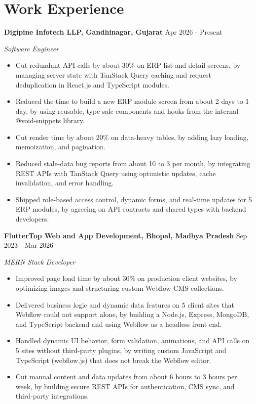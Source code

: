 \documentclass[a4paper,10pt]{article}
\newcommand{\company}[2]{\textbf{#1} \hfill #2\par}
\newcommand{\position}[2]{\textit{#1} \hfill \textit{#2}\par\vspace{1pt}}
\begin{document}
\section{Work Experience}
\company{Digipine Infotech LLP, Gandhinagar, Gujarat}{Apr 2026 - Present}
\position{Software Engineer}{}
\begin{itemize}
  \item Cut redundant API calls by about 30\% on ERP list and detail screens, by managing server state with TanStack Query caching and request deduplication in React.js and TypeScript modules.
  \item Reduced the time to build a new ERP module screen from about 2 days to 1 day, by using reusable, type-safe components and hooks from the internal @void-snippets library.
  \item Cut render time by about 20\% on data-heavy tables, by adding lazy loading, memoization, and pagination.
  \item Reduced stale-data bug reports from about 10 to 3 per month, by integrating REST APIs with TanStack Query using optimistic updates, cache invalidation, and error handling.
  \item Shipped role-based access control, dynamic forms, and real-time updates for 5 ERP modules, by agreeing on API contracts and shared types with backend developers.
\end{itemize}

\vspace{3pt}
\company{FlutterTop Web and App Development, Bhopal, Madhya Pradesh}{Sep 2023 - Mar 2026}
\position{MERN Stack Developer}{}
\begin{itemize}
  \item Improved page load time by about 30\% on production client websites, by optimizing images and structuring custom Webflow CMS collections.
  \item Delivered business logic and dynamic data features on 5 client sites that Webflow could not support alone, by building a Node.js, Express, MongoDB, and TypeScript backend and using Webflow as a headless front end.
  \item Handled dynamic UI behavior, form validation, animations, and API calls on 5 sites without third-party plugins, by writing custom JavaScript and TypeScript (webflow.js) that does not break the Webflow editor.
  \item Cut manual content and data updates from about 6 hours to 3 hours per week, by building secure REST APIs for authentication, CMS sync, and third-party integrations.
\end{itemize}
\end{document}
